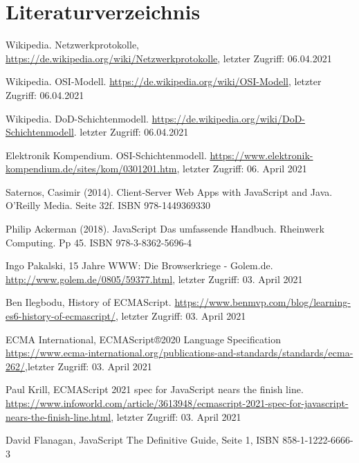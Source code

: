 \documentclass[11pt,a4paper]{article}
\begin{document}
\section*{Literaturverzeichnis}
\begin{itemize}
%
%
%
%

 Wikipedia. Netzwerkprotokolle, \url{https://de.wikipedia.org/wiki/Netzwerkprotokolle}, letzter Zugriff: 06.04.2021

  Wikipedia. OSI-Modell. \url{https://de.wikipedia.org/wiki/OSI-Modell}, letzter Zugriff: 06.04.2021

 Wikipedia. DoD-Schichtenmodell. \url{https://de.wikipedia.org/wiki/DoD-Schichtenmodell}. letzter Zugriff: 06.04.2021

 Elektronik Kompendium. OSI-Schichtenmodell. \url{https://www.elektronik-kompendium.de/sites/kom/0301201.htm}, letzter Zugriff: 06. April 2021

%
%
%
%

 Saternos, Casimir (2014). Client-Server Web Apps with JavaScript and Java. O'Reilly Media. Seite 32f. ISBN 978-1449369330

 Philip Ackerman (2018). JavaScript Das umfassende Handbuch. Rheinwerk Computing. Pp 45. ISBN 978-3-8362-5696-4

 Ingo Pakalski, 15 Jahre WWW: Die Browserkriege - Golem.de. \url{http://www.golem.de/0805/59377.html}, letzter Zugriff: 03. April 2021

 Ben Ilegbodu, History of ECMAScript.
\url{https://www.benmvp.com/blog/learning-es6-history-of-ecmascript/}, letzter Zugriff: 03. April 2021

 ECMA International, ECMAScript®2020 Language Specification \url{https://www.ecma-international.org/publications-and-standards/standards/ecma-262/},letzter Zugriff: 03. April 2021

 Paul Krill, ECMAScript 2021 spec for JavaScript nears the finish line. \url{https://www.infoworld.com/article/3613948/ecmascript-2021-spec-for-javascript-nears-the-finish-line.html}, letzter Zugriff: 03. April 2021

 David Flanagan, JavaScript The Definitive Guide,  Seite 1, ISBN 858-1-1222-6666-3


\end{itemize}
\end{document}
